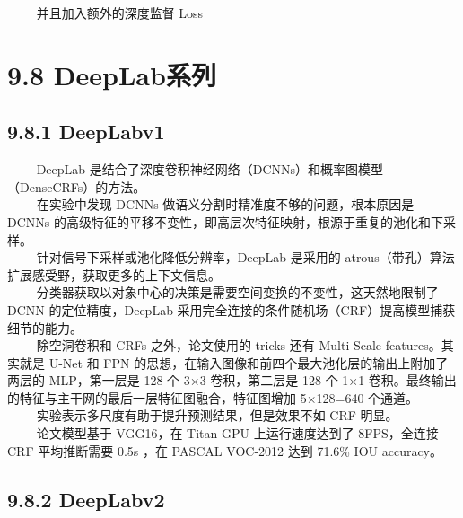    并且加入额外的深度监督 Loss

\begin{figure}
\centering
\end{figure}

\section{9.8 DeepLab系列}\label{deeplabux7cfbux5217}

\subsection{9.8.1 DeepLabv1}\label{deeplabv1}

   DeepLab
是结合了深度卷积神经网络（DCNNs）和概率图模型（DenseCRFs）的方法。\\
   在实验中发现 DCNNs 做语义分割时精准度不够的问题，根本原因是 DCNNs
的高级特征的平移不变性，即高层次特征映射，根源于重复的池化和下采样。\\
   针对信号下采样或池化降低分辨率，DeepLab 是采用的
atrous（带孔）算法扩展感受野，获取更多的上下文信息。\\
   分类器获取以对象中心的决策是需要空间变换的不变性，这天然地限制了 DCNN
的定位精度，DeepLab
采用完全连接的条件随机场（CRF）提高模型捕获细节的能力。\\
   除空洞卷积和 CRFs 之外，论文使用的 tricks 还有 Multi-Scale
features。其实就是 U-Net 和 FPN
的思想，在输入图像和前四个最大池化层的输出上附加了两层的 MLP，第一层是
128 个 3×3 卷积，第二层是 128 个 1×1
卷积。最终输出的特征与主干网的最后一层特征图融合，特征图增加 5×128=640
个通道。\\
   实验表示多尺度有助于提升预测结果，但是效果不如 CRF 明显。\\
   论文模型基于 VGG16，在 Titan GPU 上运行速度达到了 8FPS，全连接 CRF
平均推断需要 0.5s ，在 PASCAL VOC-2012 达到 71.6\% IOU accuracy。

\subsection{9.8.2 DeepLabv2}\label{deeplabv2}

